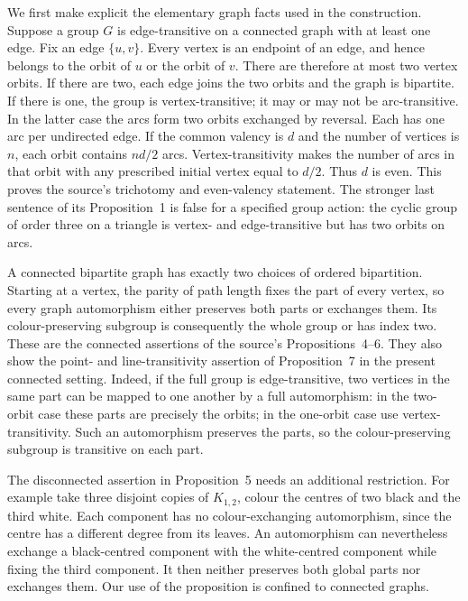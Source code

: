 \documentclass[11pt]{article}
\theoremstyle{definition}\newtheorem{definition}[theorem]{Definition}
\begin{document}
We first make explicit the elementary graph facts used in the
construction.  Suppose a group $G$ is edge-transitive on a connected
graph with at least one edge.  Fix an edge $\{u,v\}$.  Every vertex
is an endpoint of an edge, and hence belongs to the orbit of $u$ or
the orbit of $v$.  There are therefore at most two vertex orbits.
If there are two, each edge joins the two orbits and the graph is
bipartite.  If there is one, the group is vertex-transitive; it may
or may not be arc-transitive.  In the latter case the arcs form two
orbits exchanged by reversal.  Each has one arc per undirected edge.
If the common valency is $d$ and the number of vertices is $n$,
each orbit contains $nd/2$ arcs.  Vertex-transitivity makes the number
of arcs in that orbit with any prescribed initial vertex equal to
$d/2$.  Thus $d$ is even.  This proves the source's trichotomy and
even-valency statement.  The stronger last sentence of its
Proposition~1 is false for a specified group action: the cyclic
group of order three on a triangle is vertex- and edge-transitive
but has two orbits on arcs.

A connected bipartite graph has exactly two choices of ordered
bipartition.  Starting at a vertex, the parity of path length fixes
the part of every vertex, so every graph automorphism either
preserves both parts or exchanges them.  Its colour-preserving
subgroup is consequently the whole group or has index two.  These
are the connected assertions of the source's Propositions~4--6.
They also show the point- and line-transitivity assertion of
Proposition~7 in the present connected setting.  Indeed, if the full
group is edge-transitive, two vertices in the same part can be
mapped to one another by a full automorphism: in the two-orbit case
these parts are precisely the orbits; in the one-orbit case use
vertex-transitivity.  Such an automorphism preserves the parts, so
the colour-preserving subgroup is transitive on each part.

The disconnected assertion in Proposition~5 needs an additional
restriction.  For example take three disjoint copies of $K_{1,2}$,
colour the centres of two black and the third white.  Each component
has no colour-exchanging automorphism, since the centre has a
different degree from its leaves.  An automorphism can nevertheless
exchange a black-centred component with the white-centred component
while fixing the third component.  It then neither preserves both
global parts nor exchanges them.  Our use of the proposition is
confined to connected graphs.
\end{document}
